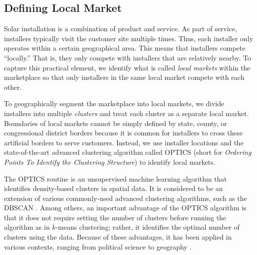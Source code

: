 \documentclass[msom,blindrev]{informs3}
\begin{document}
\subsection{Defining Local Market}
\label{defining_local_market}


Solar installation is a combination of product and service. As part of service, installers typically visit the customer site multiple times. Thus, each installer only operates  within a certain geographical area. This means that installers compete ``locally.'' That is, they only compete with installers that are relatively nearby. To capture this practical element, we identify what is called \emph{local markets} within the marketplace so that only installers in the same local market compete with each other.

To geographically segment the marketplace into local markets, we divide installers into multiple \emph{clusters} and treat each cluster as a separate local market. Boundaries of local markets cannot be simply defined by state, county, or congressional district borders because it is common for installers to cross these artificial borders to serve customers. Instead, we use installer locations and the state-of-the-art advanced clustering algorithm called OPTICS (short for \textit{Ordering Points To Identify the Clustering Structure}) to identify local markets.

The OPTICS routine is an unsupervised machine learning algorithm that identifies density-based clusters in spatial data. It is considered to be an extension of various commonly-used advanced clustering algorithms, such as the DBSCAN \citep{kanagala2016comparative}. Among others, an important advantage of the OPTICS algorithm is that it does not require setting the number of clusters before running the algorithm as in $k$-means clustering; rather, it identifies the optimal number of clusters using the data. Because of these advantages, it has been applied in various contexts, ranging from political science \citep{davidson2019neighborhood} to geography \citep{teimouri2016method}.

\end{document}
